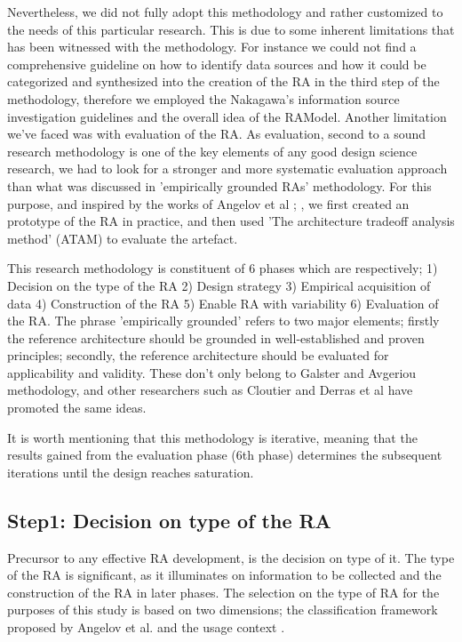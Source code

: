 \documentclass[review]{elsarticle}
\begin{document}
Nevertheless, we did not fully adopt this methodology and rather customized to the needs of this particular research. This is due to some inherent limitations that has been witnessed with the methodology. For instance we could not find a comprehensive guideline on how to identify data sources and how it could be categorized and synthesized into the creation of the RA in the third step of the methodology, therefore we employed the Nakagawa's information source investigation guidelines and the overall idea of the RAModel. Another limitation we've faced was with evaluation of the RA. As evaluation, second to a sound research methodology is one of the key elements of any good design science research, we had to look for a stronger and more systematic evaluation approach than what was discussed in 'empirically grounded RAs' methodology. For this purpose, and inspired by the works of Angelov et al \cite{angelov2008towards}; \cite{angelov2014extending}, we first created an prototype of the RA in practice, and then used 'The architecture tradeoff analysis method' (ATAM) \cite{kazman1998architecture} to evaluate the artefact.

This research methodology is constituent of 6 phases which are respectively; 1) Decision on the type of the RA 2) Design strategy 3) Empirical acquisition of data 4) Construction of the RA 5) Enable RA with variability 6) Evaluation of the RA. The phrase 'empirically grounded' refers to two major elements; firstly the reference architecture should be grounded in well-established and proven principles; secondly, the reference architecture should be evaluated for applicability and validity. These don't only belong to Galster and Avgeriou methodology, and other researchers such as Cloutier \cite{Cloutier} and Derras et al \cite{Derras} have promoted the same ideas.

It is worth mentioning that this methodology is iterative, meaning that the results gained from the evaluation phase (6th phase) determines the subsequent iterations until the design reaches saturation.

\subsection{Step1: Decision on type of the RA}

Precursor to any effective RA development, is the decision on type of it. The type of the RA is significant, as it illuminates on information to be collected and the construction of the RA in later phases. The selection on the type of RA for the purposes of this study is based on two dimensions; the classification framework proposed by Angelov et al. \cite{angelov2009classification} and the usage context \cite{angelov2008contracting}.
\end{document}
